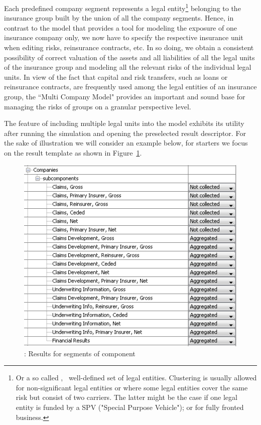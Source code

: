 Each predefined company segment represents a legal entity\footnote{Or a so called
, \ie~well-defined set of legal entities. Clustering is usually allowed for
non-significant legal entities or where some legal entities cover the same risk but consist
of two carriers. The latter might be the case if one legal entity is funded by a SPV ("Special Purpose Vehicle"); or for
fully fronted business.} belonging to the insurance group built by the union of all the
company segments.
Hence, in contrast to the \PODRA{} model that provides a tool for modeling the exposure of one
insurance company only, we now have to specify the respective insurance unit when editing
risks, reinsurance contracts, etc.
In so doing, we obtain a consistent possibility of correct valuation of the assets and all
liabilities of all the legal units of the insurance group and modeling all the relevant
risks of the individual legal units.
In view of the fact that capital and risk transfers, such as loans or reinsurance contracts,
are frequently used among the legal entities of an insurance group, the ``Multi Company
Model" provides an important and sound base for managing the risks of groups on a granular
perspective level.

The feature of including multiple legal units into the model exhibits its utility after
running the simulation and opening the preselected result descriptor. For the sake of
illustration we will consider an example below, for starters we focus on the result 
template as shown in Figure~\ref{fig:multiCompany-results}.

\begin{figure}[htb]
	\centering
	\includegraphics[scale=0.7]{images/multiCompany_companiesResult.png}
	\caption{: Results for segments of component }
	\label{fig:multiCompany-results}
\end{figure}

